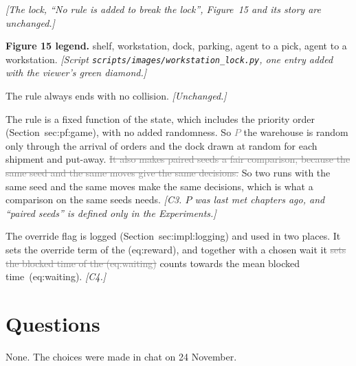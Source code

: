 \documentclass[11pt,a4paper]{article}
\newcommand{\new}[1]{\textcolor{newc}{#1}}
\newcommand{\old}[1]{\textcolor{gray}{\sout{#1}}}
\newcommand{\note}[1]{{\small\itshape [#1]}}
\newcommand{\lab}[1]{\textsf{\footnotesize #1}}
\renewcommand{\ref}[1]{\lab{#1}}
\renewcommand{\eqref}[1]{(\lab{#1})}
\newcommand{\nref}[1]{the (\lab{#1})}
\begin{document}
\emph{[The lock, ``No rule is added to break the lock'', Figure~15 and its
story are unchanged.]}

\textbf{Figure 15 legend.} shelf, workstation, dock, \new{parking,} agent to
a pick, agent to a workstation. \note{Script
\texttt{scripts/images/workstation\_lock.py}, one entry added with the
viewer's green diamond.}

The rule always ends with no collision. \emph{[Unchanged.]}

The rule is a fixed function of the state, which includes the priority order
(Section~\ref{sec:pf:game}), with no added randomness. So \old{$P$}
\new{the warehouse} is random only through the arrival of orders and the dock
drawn at random for each shipment and put-away. \old{It also makes paired
seeds a fair comparison, because the same seed and the same moves give the
same decisions.} \new{So two runs with the same seed and the same moves make
the same decisions, which is what a comparison on the same seeds needs.}
\note{C3. $P$ was last met chapters ago, and ``paired seeds'' is defined only
in the Experiments.}

The override flag is logged (Section~\ref{sec:impl:logging}) and used in
two places. It sets the override term of \nref{eq:reward}, and together
with a chosen wait it \old{sets the blocked time of \nref{eq:waiting}}
\new{counts towards the mean blocked time~\eqref{eq:waiting}}. \note{C4.}

\section*{Questions}
None. The choices were made in chat on 24 November.
\end{document}
